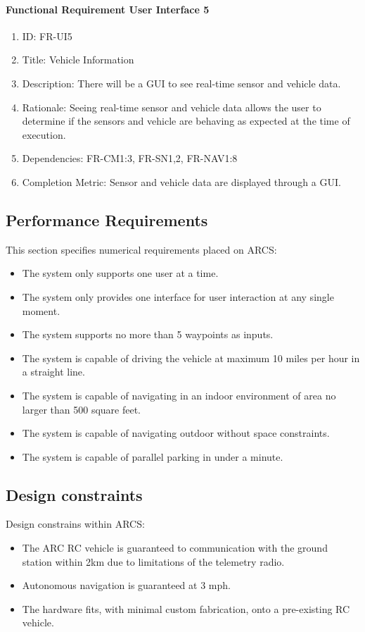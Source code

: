 \documentclass[compsoc,draftclsnofoot,onecolumn,10pt]{IEEEtran}
\begin{document}
	\paragraph{Functional Requirement User Interface 5}
		\begin{enumerate}
			\item ID: FR-UI5
			\item Title: Vehicle Information
			\item Description: There will be a GUI to see real-time sensor and vehicle data.
			\item Rationale: Seeing real-time sensor and vehicle data allows the user to determine if the sensors and vehicle are behaving as expected at the time of execution.
			\item Dependencies: FR-CM1:3, FR-SN1,2, FR-NAV1:8
			\item Completion Metric: Sensor and vehicle data are displayed through a GUI.
		\end{enumerate}

\subsection{Performance Requirements}
This section specifies numerical requirements placed on ARCS:
\begin{itemize}
	\item The system only supports one user at a time.
	\item The system only provides one interface for user interaction at any single moment.
	\item The system supports no more than 5 waypoints as inputs.
	\item The system is capable of driving the vehicle at maximum 10 miles per hour in a straight line.
	\item The system is capable of navigating in an indoor environment of area no larger than 500 square feet.
	\item The system is capable of navigating outdoor without space constraints.
	\item The system is capable of parallel parking in under a minute. 
\end{itemize}


\subsection{Design constraints}
Design constrains within ARCS:
\begin{itemize}
	\item The ARC RC vehicle is guaranteed to communication with the ground station within 2km due to limitations of the telemetry radio.
	\item Autonomous navigation is guaranteed at 3 mph.
	\item The hardware fits, with minimal custom fabrication, onto a pre-existing RC vehicle.
\end{itemize}
\end{document}
